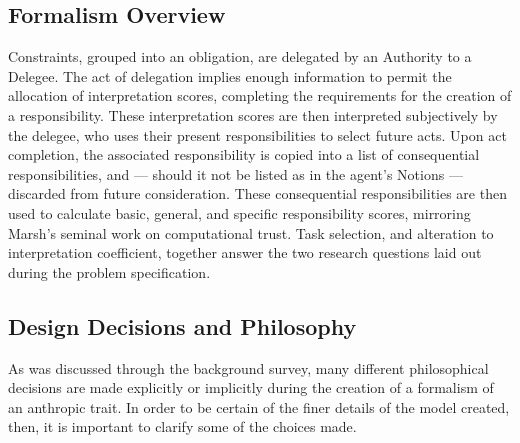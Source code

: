 \subsection{Formalism Overview}
Constraints, grouped into an obligation, are delegated by an Authority to a Delegee. The act of delegation implies enough information to permit the allocation of interpretation scores, completing the requirements for the creation of a responsibility. These interpretation scores are then interpreted subjectively by the delegee, who uses their present responsibilities to select future acts. Upon act completion, the associated responsibility is copied into a list of consequential responsibilities, and --- should it not be listed as in the agent's Notions --- discarded from future consideration. These consequential responsibilities are then used to calculate basic, general, and specific responsibility scores, mirroring Marsh's seminal work on computational trust. Task selection, and alteration to interpretation coefficient, together answer the two research questions laid out during the problem specification.\par

\subsection{Design Decisions and Philosophy}\label{subsec:design}
As was discussed through the background survey, many different philosophical decisions are made explicitly or implicitly during the creation of a formalism of an anthropic trait. In order to be certain of the finer details of the model created, then, it is important to clarify some of the choices made.\par

